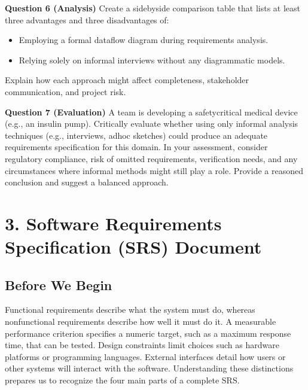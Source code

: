 \documentclass[12pt, a4paper]{article}
\begin{document}
\newpage

\textbf{Question 6 (Analysis)}  
Create a sidebyside comparison table that lists at least three advantages and three disadvantages of:
\begin{itemize}
\item Employing a formal dataflow diagram during requirements analysis.  
\item Relying solely on informal interviews without any diagrammatic models.
\end{itemize}
Explain how each approach might affect completeness, stakeholder communication, and project risk.

\newpage

\textbf{Question 7 (Evaluation)}  
A team is developing a safetycritical medical device (e.g., an insulin pump).  
Critically evaluate whether using only informal analysis techniques (e.g., interviews, adhoc sketches) could produce an adequate requirements specification for this domain.  
In your assessment, consider regulatory compliance, risk of omitted requirements, verification needs, and any circumstances where informal methods might still play a role. Provide a reasoned conclusion and suggest a balanced approach.

\newpage

\section{3. Software Requirements Specification (SRS) Document}

\subsection{Before We Begin}
Functional requirements describe what the system must do, whereas nonfunctional requirements describe how well it must do it. A measurable performance criterion specifies a numeric target, such as a maximum response time, that can be tested. Design constraints limit choices such as hardware platforms or programming languages. External interfaces detail how users or other systems will interact with the software. Understanding these distinctions prepares us to recognize the four main parts of a complete SRS.  
\end{document}
